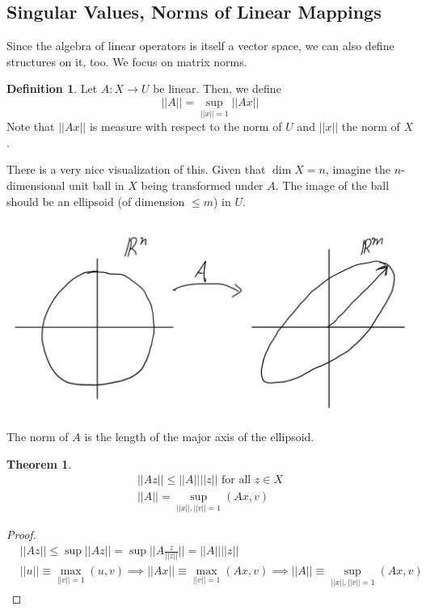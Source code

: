\documentclass{article}
\newtheorem{theorem}{Theorem}[section]
\theoremstyle{remark}
\theoremstyle{definition}
\newtheorem{definition}{Definition}[section]
\begin{document}
  \subsection{Singular Values, Norms of Linear Mappings}

    Since the algebra of linear operators is itself a vector space, we can also define structures on it, too. We focus on matrix norms. 

    \begin{definition}
    Let $A: X \longrightarrow U$ be linear. Then, we define
    \[||A|| = \sup_{||x||=1} ||A x||\]
    Note that $||A x||$ is measure with respect to the norm of $U$ and $||x||$ the norm of $X$. 
    \end{definition}

    There is a very nice visualization of this. Given that $\dim{X}=n$, imagine the $n$-dimensional unit ball in $X$ being transformed under $A$. The image of the ball should be an ellipsoid (of dimension $\leq m$) in $U$. 
    \begin{center}
        \includegraphics[scale=0.4]{img/Matrix_Norm_Visualization.png}
    \end{center}
    The norm of $A$ is the length of the major axis of the ellipsoid. 

    \begin{theorem}
    \begin{align}
        ||A z|| \leq ||A|| ||z|| \text{ for all } z \in X \\
        ||A|| = \sup_{||x||, ||v|| = 1} (A x, v)
    \end{align}
    \end{theorem}
    \begin{proof}
    \begin{align*}
        &||A z|| \leq \sup{||A z||} = \sup{\Big|\Big| A \frac{z}{||z||} \Big|\Big|} = ||A|| ||z|| \\
        &||u|| \equiv \max_{||v||=1} (u, v) \implies ||A x|| \equiv \max_{||v||=1} (Ax, v) \implies ||A|| \equiv \sup_{||x||, ||v|| =1} (A x, v)
    \end{align*}
    \end{proof}
\end{document}
